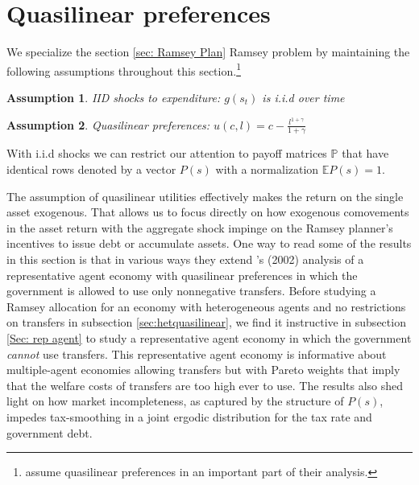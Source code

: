 \documentclass[thmsb,11pt]{article}
\newtheorem{assumption}{Assumption}
\begin{document}



\section{Quasilinear preferences}\label{Sec: quasilinear}

We specialize the section \ref{sec: Ramsey Plan} Ramsey problem by maintaining the following assumptions throughout  this
section.\footnote{\citet{Aiyagari2002} assume quasilinear preferences in an important part of
their analysis.}
\begin{assumption}
\label{ass iid}
IID shocks to expenditure: $g(s_t)$ is i.i.d over time
\end{assumption}
\begin{assumption}
\label{ass quasilinear}
Quasilinear preferences: $u(c,l)=c-\frac{l^{1+\gamma}}{1+\gamma}$
\end{assumption}
\noindent With i.i.d shocks we can restrict our attention to  payoff matrices $\mathbb{P}$ that have identical rows denoted by a vector $P(s)$
with a normalization  $\mathbb{E}P(s)=1$.

The assumption of quasilinear utilities effectively makes the return on the single asset exogenous. That allows us to focus directly on
how exogenous comovements in the asset return with the aggregate shock impinge on the Ramsey planner's incentives to issue debt or accumulate
assets.  One way to read some of the results in this section is that in various ways they extend \citeauthor{Aiyagari2002}'s (2002) analysis of a representative
agent economy with quasilinear preferences in which the government is allowed  to use only nonnegative transfers.
Before studying a Ramsey allocation for an economy with heterogeneous agents and no restrictions on transfers in subsection \ref{sec:hetquasilinear},
we find it instructive in subsection \ref{Sec: rep agent} to study a  representative agent economy in which the government \textit{cannot} use transfers.
This representative agent  economy is  informative about   multiple-agent economies allowing transfers but with   Pareto weights that imply that the welfare costs of  transfers are too high ever to use.
The results  also shed light on  how market incompleteness, as captured by the structure of $P(s)$, impedes  tax-smoothing  in a joint ergodic distribution for the tax rate and government debt.
\color{black}
\end{document}
